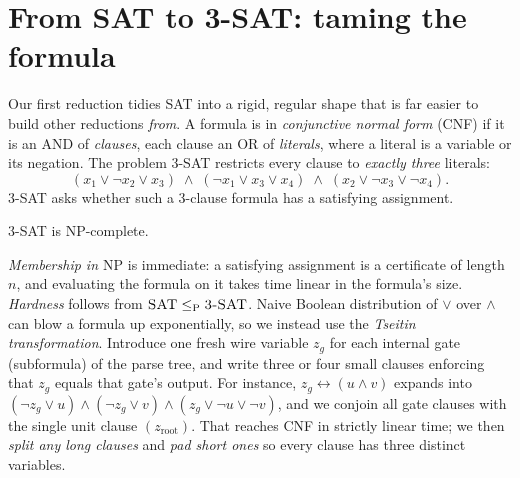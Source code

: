 \section{From SAT to 3-SAT: taming the formula}

Our first reduction tidies \textsc{SAT} into a rigid, regular shape that is far
easier to build other reductions \emph{from}. A formula is in \emph{conjunctive
normal form} (CNF) if it is an AND of \emph{clauses}, each clause an OR of
\emph{literals}, where a literal is a variable or its negation. The problem
\textsc{3-SAT} restricts every clause to \emph{exactly three} literals:
\[
  (x_1 \vee \neg x_2 \vee x_3)\;\wedge\;(\neg x_1 \vee x_3 \vee x_4)\;\wedge\;
  (x_2 \vee \neg x_3 \vee \neg x_4).
\]
\textsc{3-SAT} asks whether such a 3-clause formula has a satisfying assignment.

\begin{theorem}
\label{ch33:3sat}
\textsc{3-SAT} is NP-complete.
\end{theorem}

\emph{Membership in $\mathrm{NP}$} is immediate: a satisfying assignment is a
certificate of length $n$, and evaluating the formula on it takes time linear in
the formula's size. \emph{Hardness} follows from $\textsc{SAT}\le_{\mathrm{P}}
\textsc{3-SAT}$. Naive Boolean distribution of $\vee$ over $\wedge$ can blow a
formula up exponentially, so we instead use the \emph{Tseitin transformation}.
Introduce one fresh wire variable $z_g$ for each internal gate (subformula) of the
parse tree, and write three or four small clauses enforcing that $z_g$ equals that
gate's output. For instance, $z_g \leftrightarrow (u \wedge v)$ expands into
$(\neg z_g \vee u) \wedge (\neg z_g \vee v) \wedge (z_g \vee \neg u \vee \neg v)$,
and we conjoin all gate clauses with the single unit clause $(z_{\text{root}})$. That reaches CNF in
strictly linear time; we then \emph{split any long clauses} and \emph{pad short
ones} so every clause has three distinct variables.

